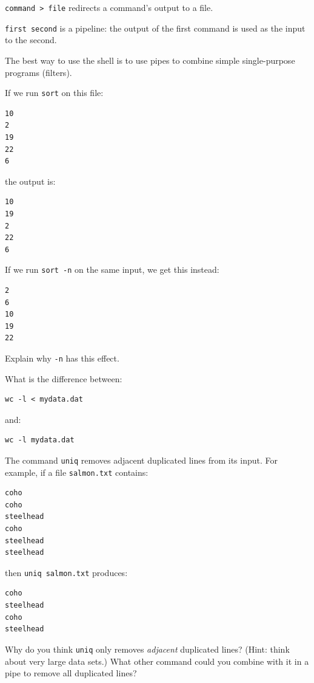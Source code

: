 \documentclass{book}
\begin{document}
\begin{keypoints}
\begin{swcitemize}
\item
  \texttt{command \textgreater{} file} redirects a command's output to a
  file.
\item
  \texttt{first \textbar{} second} is a pipeline: the output of the
  first command is used as the input to the second.
\item
  The best way to use the shell is to use pipes to combine simple
  single-purpose programs (filters).
\end{swcitemize}
\end{keypoints}

\begin{challenge}
  If we run \texttt{sort} on this file:

\begin{verbatim}
10
2
19
22
6
\end{verbatim}

  the output is:

\begin{verbatim}
10
19
2
22
6
\end{verbatim}

  If we run \texttt{sort -n} on the same input, we get this instead:

\begin{verbatim}
2
6
10
19
22
\end{verbatim}

  Explain why \texttt{-n} has this effect.
\end{challenge}

\begin{challenge}
  What is the difference between:

\begin{verbatim}
wc -l < mydata.dat
\end{verbatim}

  and:

\begin{verbatim}
wc -l mydata.dat
\end{verbatim}
\end{challenge}

\begin{challenge}
  The command \texttt{uniq} removes adjacent duplicated lines from its
  input. For example, if a file \texttt{salmon.txt} contains:

\begin{verbatim}
coho
coho
steelhead
coho
steelhead
steelhead
\end{verbatim}

  then \texttt{uniq salmon.txt} produces:

\begin{verbatim}
coho
steelhead
coho
steelhead
\end{verbatim}

  Why do you think \texttt{uniq} only removes \emph{adjacent} duplicated
  lines? (Hint: think about very large data sets.) What other command
  could you combine with it in a pipe to remove all duplicated lines?
\end{challenge}
\end{document}
